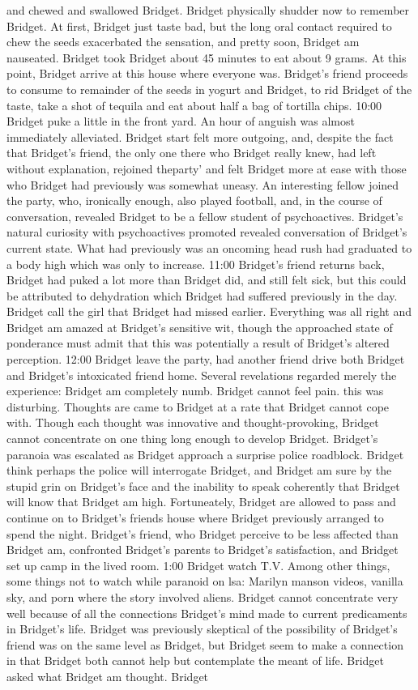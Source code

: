 \documentclass[12pt]{book}
\begin{document}
and chewed and swallowed Bridget. Bridget physically shudder now to remember Bridget. At first, Bridget just taste bad, but the long oral contact required to chew the seeds exacerbated the sensation, and pretty soon, Bridget am nauseated. Bridget took Bridget about 45 minutes to eat about 9 grams. At this point, Bridget arrive at this house where everyone was. Bridget's friend proceeds to consume to remainder of the seeds in yogurt and Bridget, to rid Bridget of the taste, take a shot of tequila and eat about half a bag of tortilla chips. 10:00 Bridget puke a little in the front yard. An hour of anguish was almost immediately alleviated. Bridget start felt more outgoing, and, despite the fact that Bridget's friend, the only one there who Bridget really knew, had left without explanation, rejoined theparty' and felt Bridget more at ease with those who Bridget had previously was somewhat uneasy. An interesting fellow joined the party, who, ironically enough, also played football, and, in the course of conversation, revealed Bridget to be a fellow student of psychoactives. Bridget's natural curiosity with psychoactives promoted revealed conversation of Bridget's current state. What had previously was an oncoming head rush had graduated to a body high which was only to increase. 11:00 Bridget's friend returns back, Bridget had puked a lot more than Bridget did, and still felt sick, but this could be attributed to dehydration which Bridget had suffered previously in the day. Bridget call the girl that Bridget had missed earlier. Everything was all right and Bridget am amazed at Bridget's sensitive wit, though the approached state of ponderance must admit that this was potentially a result of Bridget's altered perception. 12:00 Bridget leave the party, had another friend drive both Bridget and Bridget's intoxicated friend home. Several revelations regarded merely the experience: Bridget am completely numb. Bridget cannot feel pain. this was disturbing. Thoughts are came to Bridget at a rate that Bridget cannot cope with. Though each thought was innovative and thought-provoking, Bridget cannot concentrate on one thing long enough to develop Bridget. Bridget's paranoia was escalated as Bridget approach a surprise police roadblock. Bridget think perhaps the police will interrogate Bridget, and Bridget am sure by the stupid grin on Bridget's face and the inability to speak coherently that Bridget will know that Bridget am high. Fortuneately, Bridget are allowed to pass and continue on to Bridget's friends house where Bridget previously arranged to spend the night. Bridget's friend, who Bridget perceive to be less affected than Bridget am, confronted Bridget's parents to Bridget's satisfaction, and Bridget set up camp in the lived room. 1:00 Bridget watch T.V. Among other things, some things not to watch while paranoid on lsa: Marilyn manson videos, vanilla sky, and porn where the story involved aliens. Bridget cannot concentrate very well because of all the connections Bridget's mind made to current predicaments in Bridget's life. Bridget was previously skeptical of the possibility of Bridget's friend was on the same level as Bridget, but Bridget seem to make a connection in that Bridget both cannot help but contemplate the meant of life. Bridget asked what Bridget am thought. Bridget 
\end{document}
